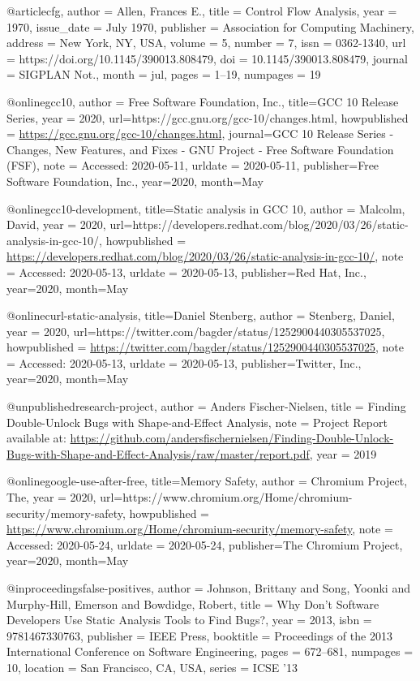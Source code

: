 @article{cfg, author = {Allen, Frances E.},
title = {Control Flow Analysis},
year = {1970},
issue_date = {July 1970},
publisher = {Association for Computing Machinery},
address = {New York, NY, USA},
volume = {5},
number = {7},
issn = {0362-1340},
url = {https://doi.org/10.1145/390013.808479},
doi = {10.1145/390013.808479},
journal = {SIGPLAN Not.},
month = jul,
pages = {1–19},
numpages = {19} 
}

@online{gcc10, author = {Free Software Foundation, Inc.},
title={GCC 10 Release Series}, 
year = 2020,
url={https://gcc.gnu.org/gcc-10/changes.html}, 
howpublished = {\url{https://gcc.gnu.org/gcc-10/changes.html}},
journal={GCC 10 Release Series - Changes, New Features, and Fixes - GNU Project - Free Software Foundation (FSF)}, 
note = {Accessed: 2020-05-11},
urldate = {2020-05-11},
publisher={Free Software Foundation, Inc.}, 
year={2020}, 
month={May}
}

@online{gcc10-development, 
title={Static analysis in GCC 10}, 
author = {Malcolm, David},
year = 2020,
url={https://developers.redhat.com/blog/2020/03/26/static-analysis-in-gcc-10/}, 
howpublished = {\url{https://developers.redhat.com/blog/2020/03/26/static-analysis-in-gcc-10/}},
note = {Accessed: 2020-05-13},
urldate = {2020-05-13},
publisher={Red Hat, Inc.}, 
year={2020}, month={May}
}

@online{curl-static-analysis, 
title={Daniel Stenberg}, 
author = {Stenberg, Daniel},
year = 2020,
url={https://twitter.com/bagder/status/1252900440305537025}, 
howpublished = {\url{https://twitter.com/bagder/status/1252900440305537025}},
note = {Accessed: 2020-05-13},
urldate = {2020-05-13},
publisher={Twitter, Inc.}, 
year={2020}, month={May}
}

@unpublished{research-project,
  author = {Anders Fischer-Nielsen},
  title  = {Finding Double-Unlock Bugs with Shape-and-Effect Analysis},
  note   = {Project Report available at: \url{https://github.com/andersfischernielsen/Finding-Double-Unlock-Bugs-with-Shape-and-Effect-Analysis/raw/master/report.pdf}},
  year   = {2019}
}

@online{google-use-after-free, 
title={Memory Safety}, 
author = {Chromium Project, The},
year = 2020,
url={https://www.chromium.org/Home/chromium-security/memory-safety}, 
howpublished = {\url{https://www.chromium.org/Home/chromium-security/memory-safety}},
note = {Accessed: 2020-05-24},
urldate = {2020-05-24},
publisher={The Chromium Project}, 
year={2020}, month={May}
}

@inproceedings{false-positives, author = {Johnson, Brittany and Song, Yoonki and Murphy-Hill, Emerson and Bowdidge, Robert}, 
title = {Why Don’t Software Developers Use Static Analysis Tools to Find Bugs?},
year = {2013},
isbn = {9781467330763},
publisher = {IEEE Press},
booktitle = {Proceedings of the 2013 International Conference on Software Engineering},
pages = {672–681},
numpages = {10},
location = {San Francisco, CA, USA}, 
series = {ICSE ’13} 
}

